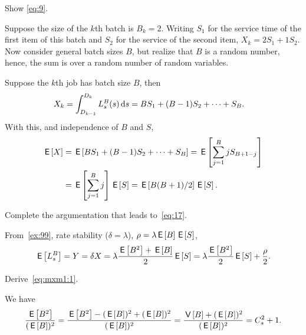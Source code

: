 \begin{exercise}\label{ex:99}
Show
\cref{eq:9}.
\begin{hint}
  Suppose the size of the $k$th batch is $B_k = 2$.
  Writing $S_1$ for the service time of the first item of this batch and $S_2$ for the service of the second item,  $X_k = 2 S_1 + 1 S_2$.
  Now consider general batch sizes $B$, but realize that $B$ is a random number, hence, the sum is  over a random number of random variables.
\end{hint}
\begin{solution}
 Suppose the $k$th job has batch size $B$, then
  \begin{align*}
    X_k &= \int_{D_{k-1}}^{D_k} L_s^B(s) \,\textrm{d}s
    = B S_1 + (B-1)S_2 + \cdots + S_B.
  \end{align*}
  With this, and independence of $B$ and $S$,
  \begin{align*}
    \,\mathsf{E}\left[X\right] & = \,\mathsf{E}\left[B S_1 + (B-1)S_2 + \cdots+ S_B\right] = \,\mathsf{E}\left[\sum_{j=1}^B j S_{B+1-j}\right] \\
    &= \,\mathsf{E}\left[\sum_{j=1}^B j\right] \,\mathsf{E}\left[S\right] = \,\mathsf{E}\left[B(B+1)/2\right] \,\mathsf{E}\left[S\right].
  \end{align*}
\end{solution}
\end{exercise}


\begin{exercise}\label{ex:100}
Complete the argumentation that leads to~\cref{eq:17}.
\begin{solution}
  From~\cref{ex:99}, rate stability ($\delta = \lambda$), $\rho=\lambda \,\mathsf{E}\left[B\right] \,\mathsf{E}\left[S\right]$,
  \begin{equation*}
    \,\mathsf{E}\left[L_s^B\right] = Y = \delta X = \lambda \frac{\,\mathsf{E}\left[B^2\right]+\,\mathsf{E}\left[B\right]}2 \,\mathsf{E}\left[S\right] =  \lambda \frac{\,\mathsf{E}\left[B^2\right]}{2} \,\mathsf{E}\left[S\right] + \frac \rho 2.
  \end{equation*}
\end{solution}
\end{exercise}


\begin{exercise}\label{q:batch}
Derive~\cref{eq:mxm1:1}.
\begin{solution}
We have
\begin{align*}
\frac{\,\mathsf{E}\left[B^2\right]}{(\,\mathsf{E}\left[B\right])^2}
  =\frac{\,\mathsf{E}\left[B^2\right]-(\,\mathsf{E}\left[B\right])^2 + (\,\mathsf{E}\left[B\right])^2}{(\,\mathsf{E}\left[B\right])^2}
= \frac{\,\mathsf{V}\left[B\right] + (\,\mathsf{E}\left[B\right])^2}{(\,\mathsf{E}\left[B\right])^2}= C_s^2+1.
\end{align*}
\end{solution}
\end{exercise}



